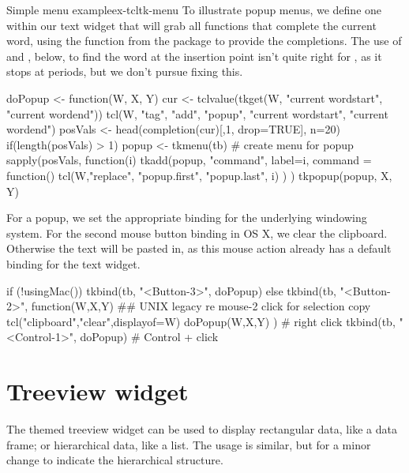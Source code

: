 \begin{example}{Simple menu example}{ex-tcltk-menu}
To illustrate popup menus, we define one within our text widget that
will grab all functions that complete the current word, using the
 function from the  package to
provide the completions.  The use of  and
, below, to find the word at the insertion point
isn't quite right for \R, as it stops at periods, but we don't pursue
fixing this.
\begin{Schunk}
\begin{Sinput}
 doPopup <- function(W, X, Y) {
   cur <- tclvalue(tkget(W, "current  wordstart", 
                            "current wordend"))
   tcl(W, "tag", "add", "popup", "current  wordstart", 
                                 "current wordend")
   posVals <- head(completion(cur)[,1, drop=TRUE], n=20)
   if(length(posVals) > 1) {
     popup <- tkmenu(tb)                # create menu for popup
     sapply(posVals, function(i) {         
       tkadd(popup, "command", label=i, command = function() {
         tcl(W,"replace", "popup.first", "popup.last", i)
       })
     })
     tkpopup(popup, X, Y)
  }}
\end{Sinput}
\end{Schunk}

For a popup, we set the appropriate binding for the underlying
windowing system. For the second mouse button binding in OS X, we
clear the clipboard. Otherwise the text  will be pasted in, as this mouse
action already has a default binding for the text widget.

\begin{Schunk}
\begin{Sinput}
 if (!usingMac()) {
   tkbind(tb, "<Button-3>", doPopup)
 } else {
   tkbind(tb, "<Button-2>", function(W,X,Y) {
     ## UNIX legacy re mouse-2 click for selection copy
     tcl("clipboard","clear",displayof=W) 
     doPopup(W,X,Y)
     })      # right click
   tkbind(tb, "<Control-1>", doPopup)     # Control + click
 }
\end{Sinput}
\end{Schunk}
\end{example}



\section{Treeview widget}
\label{sec:tcltk:treeview-widget}

The themed treeview widget can be used to display rectangular data,
like a data frame; or hierarchical data, like a list. The usage is
similar, but for a minor change to indicate the hierarchical structure.

